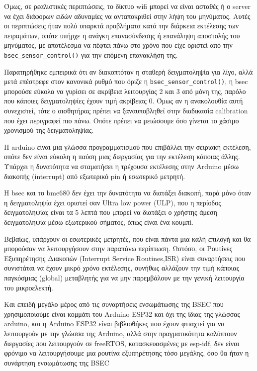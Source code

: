 Όμως, σε ρεαλιστικές περιπτώσεις, το δίκτυο wifi μπορεί να είναι ασταθές ή ο server να έχει διάφορων ειδών αδυναμίες να ανταποκριθεί στην λήψη του μηνύματος.
Αυτές οι περιπτώσεις ήταν πολύ υπαρκτά προβλήματα κατά την διάρκεια εκτέλεσης των πειραμάτων, οπότε υπήρχε η ανάγκη επανασύνδεσης ή επανάληψη αποστολής του μηνύματος,
με αποτέλεσμα να πέφτει πάνω στο χρόνο που είχε οριστεί από την \texttt{bsec\_sensor\_control()} για την επόμενη επανακλήση της.

Παρατηρήθηκε εμπειρικά ότι αν διακοπτόταν η σταθερή δειγματοληψία για λίγο, αλλά μετά επέστρεφε στον κανονικά ρυθμό που όριζε η \texttt{bsec\_sensor\_control()},
η bsec μπορούσε εύκολα να γυρίσει σε ακρίβεια λειτουργίας 2 και 3 από μόνη της, παρόλο που κάποιες δειγματοληψίες έχουν τιμή ακρίβειας 0.
Όμως αν η ανακολουθία αυτή συνεχιστεί, τότε ο αισθητήρας πρέπει να ξαναυποβληθεί στην διαδικασία calibration που έχει περιγραφεί πιο πάνω. 
Οπότε πρέπει να μειώσουμε όσο γίνεται το χάσιμο χρονισμού της δειγματοληψίας.


Η arduino είναι μια γλώσσα προγραμματισμού που επιβάλλει την σειριακή εκτέλεση, οπότε δεν είναι εύκολη η παύση μιας διεργασίας για την εκτέλεση κάποιας άλλης.
Υπάρχει η δυνατότητα να σταματήσει η τρέχουσα εκτέλεσης στην Arduino μέσω διακοπής (interrupt) από εξωτερικό pin ή εσωτερικό μετρητή.

Η bsec και το bme680 δεν έχει την δυνατότητα  να διατάξει διακοπή, παρά μόνο όταν η δειγματοληψία έχει οριστεί σαν Ultra low power (ULP), που η περίοδος δειγματοληψίας είναι τα 5 λεπτά
που μπορεί να διατάξει ο χρήστης άμεση δειγματοληψία μέσω εξωτερικού σήματος, όπως είναι ένα κουμπί.

Βεβαίως, υπάρχουν οι εσωτερικές μετρητές, που είναι πάντα μια καλή επιλογή και θα μπορούσαν να λειτουργήσουν στην παραπάνω περίπτωση.
Ωστόσο, οι Ρουτίνες Εξυπηρέτησης Διακοπών (Interrupt Service Routines,ISR) είναι συναρτήσεις που συνιστάται να έχουν μικρό χρόνο εκτέλεσης,
συνήθως αλλάζουν την τιμή κάποιας παγκόσμιας (global) μεταβλητής για να μην παρεμβάλουν με την γενική λειτουργία του μικροελεκτή.

Και επειδή μεγάλο μέρος από τις συναρτήσεις ενσωμάτωσης της BSEC που χρησιμοποιούμε είναι κομμάτι του Arduino ESP32 και όχι της ίδιας της γλώσσας arduino,
και η Arduino ESP32 είναι βιβλιοθήκες που έχουν φτιαχτεί για να λειτουργούν με την γλώσσα της Arduino, αλλά στην πραγματικότητα καλύπτουν διεργασίες που λειτουργούν σε freeRTOS,
κατασκευασμένες με esp-idf, δεν είναι φρόνιμο να λειτουργήσουμε μια ρουτίνα εξυπηρέτησης τόσο μεγάλης, όσο θα ήταν η συνάρτηση ενσωμάτωσης της BSEC 

